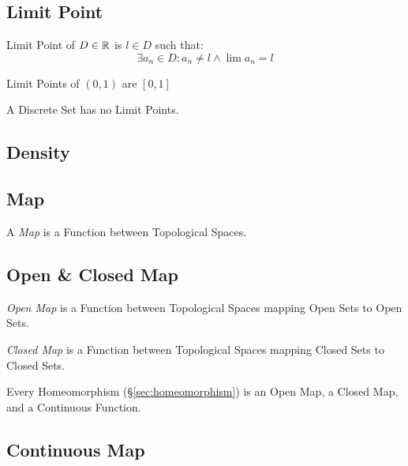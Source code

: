 \subsection{Limit Point}\label{sec:limit_point}

Limit Point of $D \in \mathbb{R}$ is $l \in D$ such that:
\[
  \exists a_n \in D : a_n \neq l \wedge \lim a_n = l
\]

Limit Points of $(0,1)$ are $[0,1]$

A Discrete Set has no Limit Points. %



\subsection{Density}\label{sec:density}

\subsection{Map}\label{sec:topology_map}

A \emph{Map} is a Function between Topological Spaces.



\subsection{Open \& Closed Map}\label{sec:open_closed_map}

\emph{Open Map} is a Function between Topological Spaces mapping Open
Sets to Open Sets.

\emph{Closed Map} is a Function between Topological Spaces mapping Closed
Sets to Closed Sets.

Every Homeomorphism (\S\ref{sec:homeomorphism}) is an Open Map, a
Closed Map, and a Continuous Function.



\subsection{Continuous Map}\label{sec:continuous_map}

